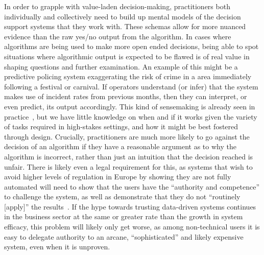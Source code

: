 \documentclass[sigchi-a, authorversion]{acmart}
\begin{document}
In order to grapple with value-laden decision-making, practitioners both individually and collectively need to build up mental models of the decision support systems that they work with. These schemas allow for more nuanced evidence than the raw yes/no output from the algorithm. In cases where algorithms are being used to make more open ended decisions, being able to spot situations where algorithmic output is expected to be flawed is of real value in shaping questions and further examination. An example of this might be a predictive policing system exaggerating the risk of crime in a area immediately following a festival or carnival. If operators understand (or infer) that the system makes use of incident rates from previous months, then they can interpret, or even predict, its output accordingly. This kind of sensemaking is already seen in practice~\cite{vealefairnessdesign2018}, but we have little knowledge on when and if it works given the variety of tasks required in high-stakes settings, and how it might be best fostered through design. Crucially, practitioners are much more likely to go against the decision of an algorithm if they have a reasonable argument as to why the algorithm is incorrect, rather than just an intuition that the decision reached is unfair. There is likely even a legal requirement for this, as systems that wish to avoid higher levels of regulation in Europe by showing they are not fully automated will need to show that the users have the ``authority and competence'' to challenge the system, as well as demonstrate that they do not ``routinely [apply]'' the results~\cite{vealeedwardsa29}.  If the hype towards trusting data-driven systems continues in the business sector at the same or greater rate than the growth in system efficacy, this problem will likely only get worse, as among non-technical users it is easy to delegate authority to an arcane, ``sophisticated'' and likely expensive system, even when it is unproven.
\end{document}
